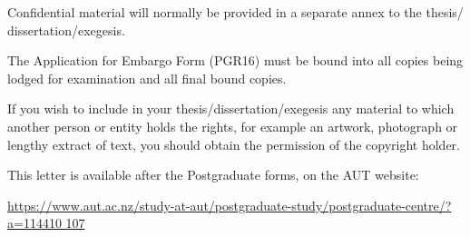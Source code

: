  \label{chap:copyright}
Confidential material will normally be provided in a separate annex to the thesis/ dissertation/exegesis.

The Application for Embargo Form (PGR16) must be bound into all copies being lodged for examination and all final bound copies.

If you wish to include in your thesis/dissertation/exegesis any material to which another person or entity holds the rights, for example an artwork, photograph or lengthy extract of text, you should obtain the permission of the copyright holder.

This letter is available after the Postgraduate forms, on the AUT website:

\noindent{}\url{https://www.aut.ac.nz/study-at-aut/postgraduate-study/postgraduate-centre/?a=114410
107}